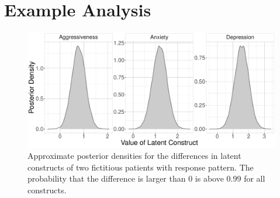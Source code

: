 \documentclass[a4paper]{article}
\begin{document}



\newpage
\appendix
{}

\section{Example Analysis}

\begin{figure}[!ht]
	\includegraphics[width=\textwidth]{figures/twoPatientsDiffDensity.pdf}
	\caption{Approximate posterior densities for the differences in latent constructs of two fictitious patients with response pattern. The probability that the difference is larger than 0 is above $0.99$ for all constructs.}
	\label{fig:ExamplePosteriorDiff}
\end{figure}
\end{document}
